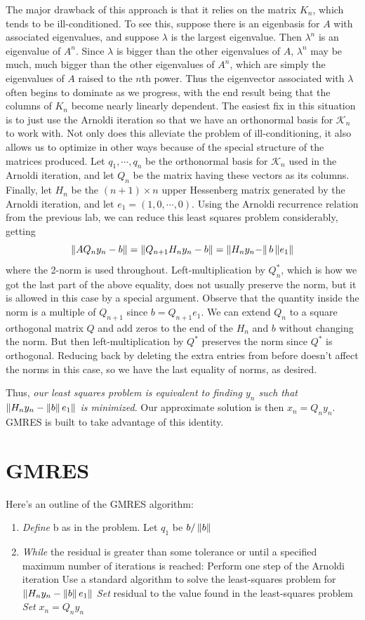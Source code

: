 The major drawback of this approach is that it relies on the matrix $K_n$, which tends to be ill-conditioned.
To see this, suppose there is an eigenbasis for $A$ with associated eigenvalues, and suppose $\lambda$ is the largest eigenvalue.
Then $\lambda^n$ is an eigenvalue of $A^n$.
Since $\lambda$ is bigger than the other eigenvalues of $A$, $\lambda^n$ may be much, much bigger than the other eigenvalues of $A^n$, which are simply the eigenvalues of $A$ raised to the $n$th power.
Thus the eigenvector associated with $\lambda$ often begins to dominate as we progress, with the end result being that the columns of $K_n$ become nearly linearly dependent.
The easiest fix in this situation is to just use the Arnoldi iteration so that we have an orthonormal basis for $\mathcal{K}_n$ to work with.
Not only does this alleviate the problem of ill-conditioning, it also allows us to optimize in other ways because of the special structure of the matrices produced.
Let $q_1,\cdots, q_n$ be the orthonormal basis for $\mathcal{K}_n$ used in the Arnoldi iteration, and let $Q_n$ be the matrix having these vectors as its columns.
Finally, let $H_n$ be the $(n+1)\times n$ upper Hessenberg matrix generated by the Arnoldi iteration, and let $e_1=(1,0,\cdots,0)$.
Using the Arnoldi recurrence relation from the previous lab, we can reduce this least squares problem considerably, getting
\[\left\lVert AQ_n y_n-b\right\rVert=\left\lVert Q_{n+1}H_{n}y_n-b\right\rVert=\left\lVert H_ny_n-\right\rVert b \left\lVert e_1\right\rVert\]
where the 2-norm is used throughout.
Left-multiplication by $Q_{n}^{*}$, which is how we got the last part of the above equality, does not usually preserve the norm, but it is allowed in this case by a special argument.
Observe that the quantity inside the norm is a multiple of $Q_{n+1}$ since $b=Q_{n+1}e_1$.
We can extend $Q_n$ to a square orthogonal matrix $Q$ and add zeros to the end of the $H_n$ and $b$ without changing the norm.
But then left-multiplication by $Q^*$ preserves the norm since $Q^*$ is orthogonal.
Reducing back by deleting the extra entries from before doesn't affect the norms in this case, so we have the last equality of norms, as desired.

Thus, \emph{our least squares problem is equivalent to finding $y_n$ such that $\left\lVert H_n y_n - \left\lVert b\right\rVert e_1\right\rVert$ is minimized}.
Our approximate solution is then $x_n=Q_n y_n$. GMRES is built to take advantage of this identity.

\section*{GMRES}
Here's an outline of the GMRES algorithm:
\begin{enumerate}
\item \emph{Define} b as in the problem. Let $q_1$ be $b/\left\lVert b\right\rVert$
\item \emph{While} the residual is greater than some tolerance or until a specified maximum number of 
iterations is reached:
\subitem Perform one step of the Arnoldi iteration
\subitem Use a standard algorithm to solve the least-squares problem for $\left\lVert H_n y_n - \left\lVert b\right\rVert e_1\right\rVert$
\subitem \emph{Set} residual to the value found in the least-squares problem
\subitem \emph{Set} $x_n=Q_n y_n$
\end{enumerate}

